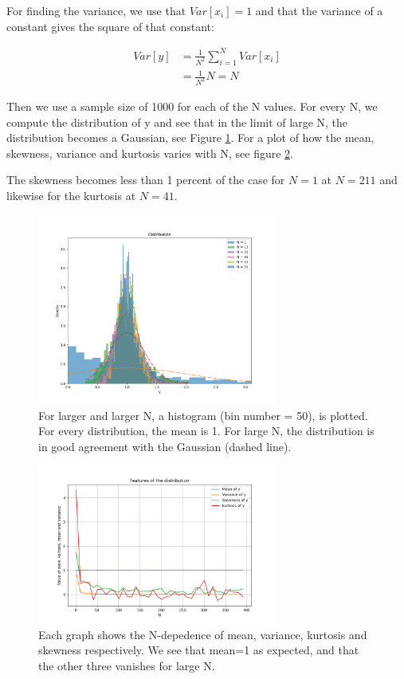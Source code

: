 \documentclass[11pt]{article}
\begin{document}
For finding the variance, we use that $Var[x_i]=1$ and that the variance of a constant gives the square of that constant:

\begin{align}
    Var[y]&=\frac{1}{N^2}\sum_{i=1}^{N}Var[x_i]\\
    &=\frac{1}{N^2}N=N
\end{align}


Then we use a sample size of 1000 for each of the N values. For every N, we compute the distribution of y and see that in the limit of large N, the distribution becomes a Gaussian, see Figure \ref*{gaus}. For a plot of how the mean, skewness, variance and kurtosis varies with N, see figure \ref*{feat}. 


The skewness becomes less than 1 percent of the case for $N=1$ at $N=211$ and likewise for the kurtosis at $N=41$.

\begin{figure}[!htbp]
    \centering
    \includegraphics[width=0.7\textwidth]{gaus.png}
    \caption{For larger and larger N, a histogram (bin number = 50), is plotted. For every distribution, the mean is 1. For large N, the distribution is in good agreement with the Gaussian (dashed line).}
    \label{gaus}
\end{figure}


\begin{figure}[!htbp]
    \centering
    \includegraphics[width=0.7\textwidth]{distribution_feat.png}
    \caption{Each graph shows the N-depedence of mean, variance, kurtosis and skewness respectively. We see that mean=1 as expected, and that the other three vanishes for large N.}
    \label{feat}
\end{figure}
\end{document}

